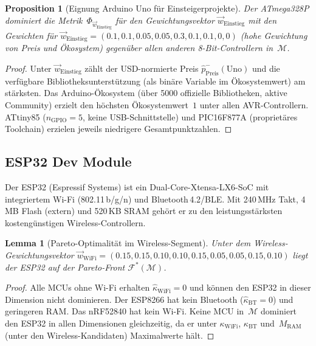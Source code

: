 ﻿\documentclass[12pt, a4paper]{article}
\theoremstyle{plain}
\newtheorem{lemma}[theorem]{Lemma}
\newtheorem{proposition}[theorem]{Proposition}
\theoremstyle{definition}
\theoremstyle{remark}
\begin{document}
\begin{proposition}[Eignung Arduino Uno für Einsteigerprojekte]
\label{prop:arduino}
  Der ATmega328P dominiert die Metrik~$\Phi_{\vec{w}_\text{Einstieg}}$
  für den Gewichtungsvektor
  $\vec{w}_\text{Einstieg}$ mit den Gewichten für $\vec{w}_\text{Einstieg} = (0.1, 0.1, 0.05, 0.05, 0.3, 0.1, 0.1, 0, 0)$
  (hohe Gewichtung von Preis und Ökosystem) gegenüber allen anderen
  8-Bit-Controllern in~$\mathcal{M}$.
\end{proposition}

\begin{proof}
  Unter $\vec{w}_\text{Einstieg}$ zählt der USD-normierte Preis
  $\hat{p}_\text{Preis}^{-}(\text{Uno})$ und die verfügbare
  Bibliotheksunterstützung (als binäre Variable im Ökosystemwert) am stärksten.
  Das Arduino-Ökosystem (über 5000 offizielle Bibliotheken, aktive Community)
  erzielt den höchsten Ökosystemwert~$1$ unter allen AVR-Controllern.
  ATtiny85 ($n_\text{GPIO}=5$, keine USB-Schnitt\-stelle) und PIC16F877A
  (proprietäres Toolchain) erzielen jeweils niedrigere Gesamtpunktzahlen.
 
\end{proof}

\subsection{ESP32 Dev Module}

Der ESP32 (Espressif Systems) ist ein Dual-Core-Xtensa-LX6-SoC mit integriertem
Wi-Fi (802.11\,b/g/n) und Bluetooth\,4.2/BLE.
Mit 240\,MHz Takt, 4\,MB Flash (extern) und 520\,KB SRAM gehört er zu den
leistungsstärksten kostengünstigen Wireless-Controllern.

\begin{lemma}[Pareto-Optimalität im Wireless-Segment]
\label{lem:esp32_pareto}
  Unter dem Wireless-Gewicht\-ungsvektor
  $\vec{w}_\text{WiFi} = (0.15, 0.15, 0.10, 0.10, 0.15, 0.05, 0.05, 0.15, 0.10)$
  liegt der ESP32 auf der Pareto-Front $\mathcal{F}^*(\mathcal{M})$.
\end{lemma}

\begin{proof}
  Alle MCUs ohne Wi-Fi erhalten $\hat{\kappa}_\text{WiFi} = 0$ und können
  den ESP32 in dieser Dimension nicht dominieren.
  Der ESP8266 hat kein Bluetooth ($\hat{\kappa}_\text{BT}=0$) und geringeren RAM.
  Das nRF52840 hat kein Wi-Fi.
  Keine MCU in~$\mathcal{M}$ dominiert den ESP32 in allen Dimensionen
  gleichzeitig, da er unter $\kappa_\text{WiFi}$, $\kappa_\text{BT}$
  und~$M_\text{RAM}$ (unter den Wireless-Kandidaten) Maximalwerte hält.
 
\end{proof}
\end{document}
